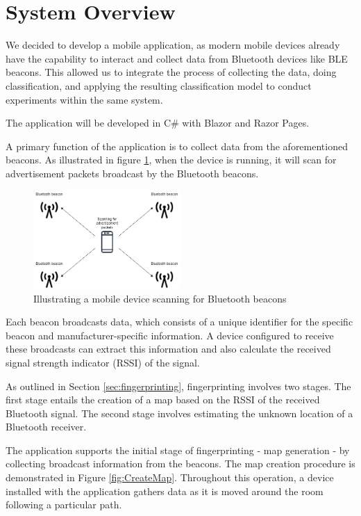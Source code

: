 \section{System Overview}\label{sec:system_overview}

We decided to develop a mobile application, as modern mobile devices already have the capability to interact and collect data from Bluetooth devices like BLE beacons. 
This allowed us to integrate the process of collecting the data, doing classification, and applying the resulting classification model to conduct experiments within the same system.

The application will be developed in C\#\cite{billwagnerDocsGetStarted} with Blazor\cite{BlazorBuildClient} and Razor Pages\cite{tdykstraIntroductionRazorPages2023}.

A primary function of the application is to collect data from the aforementioned beacons. 
As illustrated in figure \ref{fig:ScanAdvertisement}, when the device is running, it will scan for advertisement packets broadcast by the Bluetooth beacons.

\begin{figure}[H]
    \centering
    \includegraphics[width=0.5\textwidth]{images/ScanningForAdvertisement.drawio.png}
    \caption{Illustrating a mobile device scanning for Bluetooth beacons}
    \label{fig:ScanAdvertisement}
\end{figure}

Each beacon broadcasts data, which consists of a unique identifier for the specific beacon and manufacturer-specific information.
A device configured to receive these broadcasts can extract this information and also calculate the received signal strength indicator (RSSI) of the signal.

As outlined in Section \ref{sec:fingerprinting}, fingerprinting involves two stages.
The first stage entails the creation of a map based on the RSSI of the received Bluetooth signal. The second stage involves estimating the unknown location of a Bluetooth receiver.

The application supports the initial stage of fingerprinting - map generation - by collecting broadcast information from the beacons. 
The map creation procedure is demonstrated in Figure \ref{fig:CreateMap}. 
Throughout this operation, a device installed with the application gathers data as it is moved around the room following a particular path.

